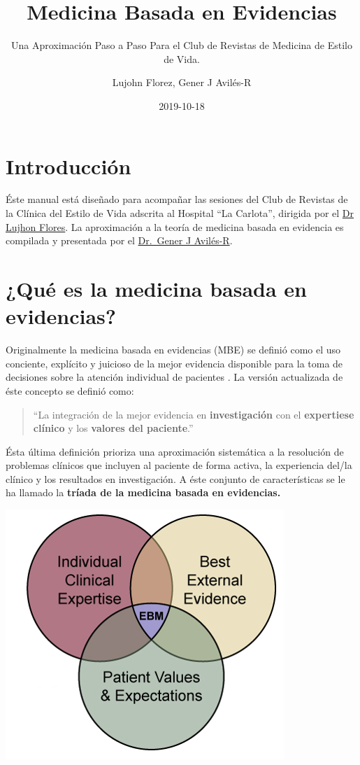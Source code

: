 \documentclass[]{book}
\title{Medicina Basada en Evidencias}
\subtitle{Una Aproximación Paso a Paso Para el Club de Revistas de Medicina de Estilo de Vida.}
\author{Lujohn Florez, Gener J Avilés-R}
\date{2019-10-18}
\begin{document}
\maketitle

{
\setcounter{tocdepth}{1}
\tableofcontents
}
\hypertarget{introduccion}{%
\chapter{Introducción}\label{introduccion}}

Éste manual está diseñado para acompañar las sesiones del Club de Revistas de la Clínica del Estilo de Vida adscrita al Hospital ``La Carlota'', dirigida por el \href{https://www.linkedin.com/in/lujohnflorez/}{Dr Lujhon Flores}.
La aproximación a la teoría de medicina basada en evidencia es compilada y presentada por el \href{https://www.linkedin.com/in/generaviles/}{Dr.~Gener J Avilés-R}.

\hypertarget{intro}{%
\chapter{¿Qué es la medicina basada en evidencias?}\label{intro}}

Originalmente la medicina basada en evidencias (MBE) se definió como el uso conciente, explícito y juicioso de la mejor evidencia disponible para la toma de decisiones sobre la atención individual de pacientes \citep{sackett1996evidence}.
La versión actualizada de éste concepto se definió como:

\begin{quote}
``La integración de la mejor evidencia en \textbf{investigación} con el \textbf{expertiese clínico} y los \textbf{valores del paciente}.'' \citep{straus2018evidence}
\end{quote}

Ésta última definición prioriza una aproximación sistemática a la resolución de problemas clínicos que incluyen al paciente de forma activa, la experiencia del/la clínico y los resultados en investigación. A éste conjunto de características se le ha llamado la \textbf{tríada de la medicina basada en evidencias.}

\includegraphics{img/EBM.png}
\end{document}
